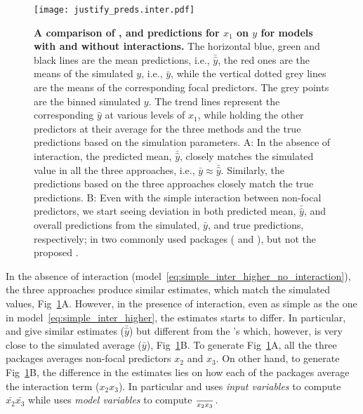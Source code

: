 \begin{figure}[h]
\begin{center}
\texttt{[image: justify\_preds.inter.pdf]}
\end{center}
\caption{{\bf A comparison of ,  and  predictions for $x_1$ on $y$ for models with and without interactions.}
The horizontal blue, green and black lines are the mean predictions, i.e., $\bar{\hat{y}}$, the red ones are the means of the simulated $y$, i.e., $\bar{y}$, while the vertical dotted grey lines are the means of the corresponding focal predictors. The grey points are the binned simulated $y$. The trend lines represent the corresponding $\hat{y}$ at various levels of $x_1$, while holding the other predictors at their average for the three methods and the true predictions based on the simulation parameters. A: In the absence of interaction, the predicted mean, $\bar{\hat{y}}$, closely matches the simulated value in all the three approaches, i.e., $\bar{y} \approx \bar{\hat{y}}$. Similarly, the predictions based on the three approaches closely match the true predictions. B: Even with the simple interaction between non-focal predictors, we start seeing deviation in both predicted mean, $\bar{\hat{y}}$, and overall predictions from the simulated, $\bar{y}$, and true predictions, respectively; in two commonly used packages ( and ), but not the proposed .}
\label{fig:justify_plots}
\end{figure}

In the absence of interaction (model~\ref{eq:simple_inter_higher_no_interaction}), the three approaches produce similar estimates, which match the simulated values, Fig~\ref{fig:justify_plots}A. However, in the presence of interaction, even as simple as the one in model~\ref{eq:simple_inter_higher}, the estimates starts to differ. In particular,  and  give similar estimates ($\bar{\hat{y}}$) but different from the 's which, however, is very close to the simulated average ($\bar{y}$), Fig~\ref{fig:justify_plots}B. To generate Fig~\ref{fig:justify_plots}A, all the three packages averages non-focal predictors $x_2$ and $x_3$. On other hand, to generate Fig~\ref{fig:justify_plots}B, the difference in the estimates lies on how each of the packages average the interaction term ($x_2x_3$). In particular  and  uses \emph{input variables} to compute $\bar{x_2}\bar{x_3}$ while  uses \emph{model variables} to compute $\over{x_2x_3}$.

